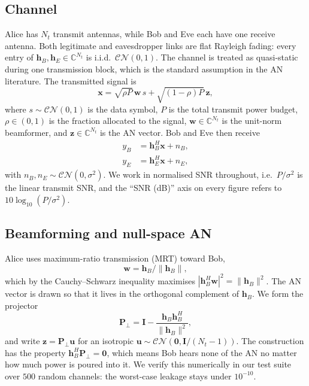 \documentclass[conference]{IEEEtran}
\begin{document}
\subsection{Channel}
Alice has $N_t$ transmit antennas, while Bob and Eve each have one
receive antenna. Both legitimate and eavesdropper links are flat
Rayleigh fading: every entry of $\mathbf{h}_B, \mathbf{h}_E \in
\mathbb{C}^{N_t}$ is i.i.d.\ $\mathcal{CN}(0, 1)$. The channel is
treated as quasi-static during one transmission block, which is the
standard assumption in the AN literature. The transmitted signal is
\begin{equation}
\mathbf{x} = \sqrt{\rho P}\, \mathbf{w}\, s
           + \sqrt{(1-\rho) P}\, \mathbf{z},
\label{eq:tx-signal}
\end{equation}
where $s \sim \mathcal{CN}(0, 1)$ is the data symbol, $P$ is the total
transmit power budget, $\rho \in (0, 1)$ is the fraction allocated to
the signal, $\mathbf{w} \in \mathbb{C}^{N_t}$ is the unit-norm
beamformer, and $\mathbf{z} \in \mathbb{C}^{N_t}$ is the AN vector.
Bob and Eve then receive
\begin{align}
y_B &= \mathbf{h}_B^H \mathbf{x} + n_B, \\
y_E &= \mathbf{h}_E^H \mathbf{x} + n_E,
\end{align}
with $n_B, n_E \sim \mathcal{CN}(0, \sigma^2)$. We work in normalised
SNR throughout, i.e.\ $P / \sigma^2$ is the linear transmit SNR, and
the ``SNR (dB)'' axis on every figure refers to
$10 \log_{10}(P/\sigma^2)$.

\subsection{Beamforming and null-space AN}
Alice uses maximum-ratio transmission (MRT) toward Bob,
\begin{equation}
\mathbf{w} = \mathbf{h}_B / \|\mathbf{h}_B\|,
\end{equation}
which by the Cauchy--Schwarz inequality maximises
$|\mathbf{h}_B^H \mathbf{w}|^2 = \|\mathbf{h}_B\|^2$. The AN vector is
drawn so that it lives in the orthogonal complement of $\mathbf{h}_B$.
We form the projector
\begin{equation}
\mathbf{P}_\perp = \mathbf{I}
  - \frac{\mathbf{h}_B \mathbf{h}_B^H}{\|\mathbf{h}_B\|^2},
\end{equation}
and write $\mathbf{z} = \mathbf{P}_\perp \mathbf{u}$ for an isotropic
$\mathbf{u} \sim \mathcal{CN}(\mathbf{0}, \mathbf{I}/(N_t-1))$. The
construction has the property
$\mathbf{h}_B^H \mathbf{P}_\perp = \mathbf{0}$, which means Bob hears
none of the AN no matter how much power is poured into it. We verify
this numerically in our test suite over $500$ random channels: the
worst-case leakage stays under $10^{-10}$.
\end{document}
